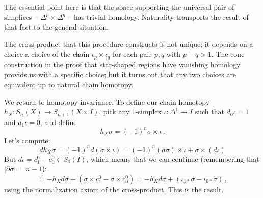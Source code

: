 The essential point here is that the space supporting the universal pair of
simplices -- $\Delta^p\times\Delta^q$ -- has trivial homology. Naturality 
transports the result of that fact to the general situation. 
 
The cross-product that this procedure constructs is not unique; it depends on a choice a choice of the chain $\iota_p\times\iota_q$ for each pair $p,q$ with $p+q>1$. The cone construction in the proof that star-shaped regions have vanishing homology provids us with a specific choice; but it turns out that any two choices are equivalent up to natural chain homotopy. 

We return to homotopy invariance. To define our chain homotopy
$h_X:S_n(X)\to S_{n+1}(X\times I)$, pick any 1-simplex $\iota:\Delta^1\to I$
such that $d_0\iota=1$ and $d_1\iota=0$, and define
\[
h_X\sigma =(-1)^n\sigma\times\iota\,.
\]
Let's compute:
		\begin{equation*}
		dh_X\sigma =(-1)^nd(\sigma\times \iota) = 
(-1)^n(d\sigma)\times\iota + \sigma\times(d\iota)
		\end{equation*}
But $d\iota = c_1^0 - c_0^0\in S_0(I)$, 
which means that we can continue (remembering that $|\partial\sigma|=n-1$):
\[
=-h_X d\sigma+(\sigma\times c_1^0-\sigma\times c_0^0)
=-h_X d\sigma+(\iota_{1*}\sigma-\iota_{0*}\sigma)\,,
\]
using the normalization axiom of the cross-product. This is the result.


